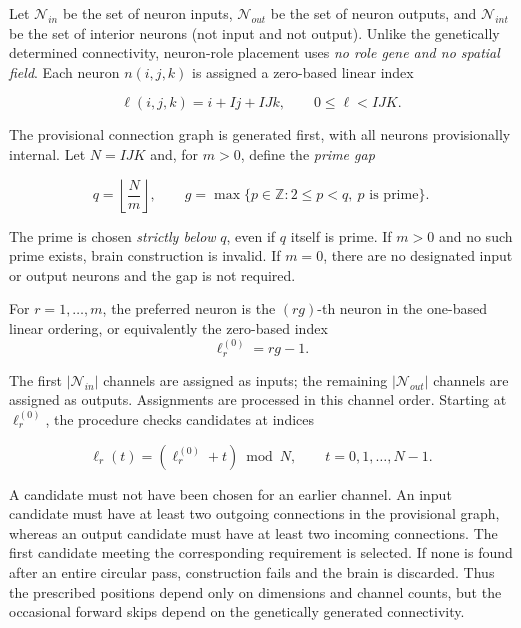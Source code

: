 \documentclass[12pt,a4paper]{article}
\begin{document}
\begin{enumerate}
	Let $\mathcal{N}_{in}$ be the set of neuron inputs, $\mathcal{N}_{out}$ be the set of neuron outputs, and $\mathcal{N}_{int}$ be the set of interior neurons (not input and not output). 	Unlike the genetically determined connectivity, neuron-role placement uses \emph{no role gene and no spatial field}. Each neuron $n(i,j,k)$ is assigned a zero-based linear index
	
	\begin{equation}
	\ell(i,j,k)=i+Ij+IJk,\qquad 0\leq\ell<IJK.
	\label{role_linear_index}
	\end{equation}
	
	The provisional connection graph is generated first, with all neurons provisionally internal. Let $N=IJK$ and, for $m>0$, define the \emph{prime gap}
	
	\begin{equation}
	q = \left\lfloor\frac{N}{m}\right\rfloor,\qquad
	g = \max\{p\in\mathbb{Z}: 2\leq p<q,\ p\text{ is prime}\}.
	\label{role_prime_gap}
	\end{equation}
	
	The prime is chosen \emph{strictly below} $q$, even if $q$ itself is prime. If $m>0$ and no such prime exists, brain construction is invalid. If $m=0$, there are no designated input or output neurons and the gap is not required.

	For $r=1,\ldots,m$, the preferred neuron is the $(rg)$-th neuron in the one-based linear ordering, or equivalently the zero-based index
	\begin{equation}
	\ell_r^{(0)}=rg-1.
	\label{role_prime_preferred}
	\end{equation}
	
	The first $|\mathcal{N}_{in}|$ channels are assigned as inputs; the remaining $|\mathcal{N}_{out}|$ channels are assigned as outputs. Assignments are processed in this channel order. Starting at $\ell_r^{(0)}$, the procedure checks candidates at indices
	
	\begin{equation}
	\ell_r(t)=(\ell_r^{(0)}+t)\bmod N,\qquad t=0,1,\ldots,N-1.
	\label{role_prime_circular}
	\end{equation}
	
	A candidate must not have been chosen for an earlier channel. An input candidate must have at least two outgoing connections in the provisional graph, whereas an output candidate must have at least two incoming connections. The first candidate meeting the corresponding requirement is selected. If none is found after an entire circular pass, construction fails and the brain is discarded. Thus the prescribed positions depend only on dimensions and channel counts, but the occasional forward skips depend on the genetically generated connectivity.


\end{enumerate}
\end{document}
